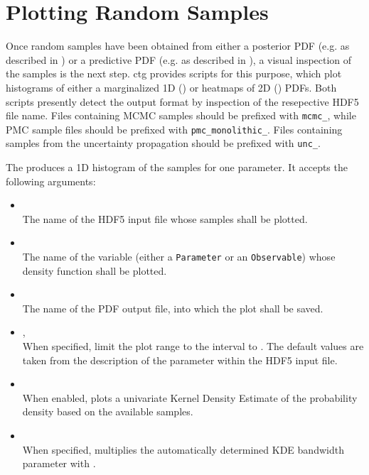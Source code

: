 \section{Plotting Random Samples}
\label{sec:usage:ctg-plot}

Once random samples have been obtained from either a posterior PDF (e.g. as
described in ) or a predictive PDF (e.g. as
described in ), a visual inspection of
the samples is the next step.  ctg provides scripts for this purpose, which
plot histograms of either a marginalized 1D () or heatmaps
of 2D () PDFs.  Both scripts presently detect the output
format by inspection of the resepective HDF5 file name. Files containing MCMC
samples should be prefixed with \texttt{mcmc\_}, while PMC sample files should
be prefixed with \texttt{pmc\_monolithic\_}. Files containing samples from the
uncertainty propagation should be prefixed with \texttt{unc\_}.

The  produces a 1D histogram of the samples for one parameter.
It accepts the following arguments:
\begin{itemize}
    \item[] \\[\medskipamount]
        The name of the HDF5 input file whose samples shall be plotted.

    \item[] \\[\medskipamount]
        The name of the variable (either a \texttt{Parameter} or an \texttt{Observable}) whose
        density function shall be plotted.

    \item[] \\[\medskipamount]
        The name of the PDF output file, into which the plot shall be saved.

    \item[] , \\[\medskipamount]
        When specified, limit the plot range to the interval  to .
        The default values are taken from the description of the parameter within the
        HDF5 input file.

    \item[] \\[\medskipamount]
        When enabled, plots a univariate Kernel Density Estimate of the probability
        density based on the available samples.

    \item[] \\[\medskipamount]
        When specified, multiplies the automatically determined KDE bandwidth parameter
        with .
\end{itemize}

